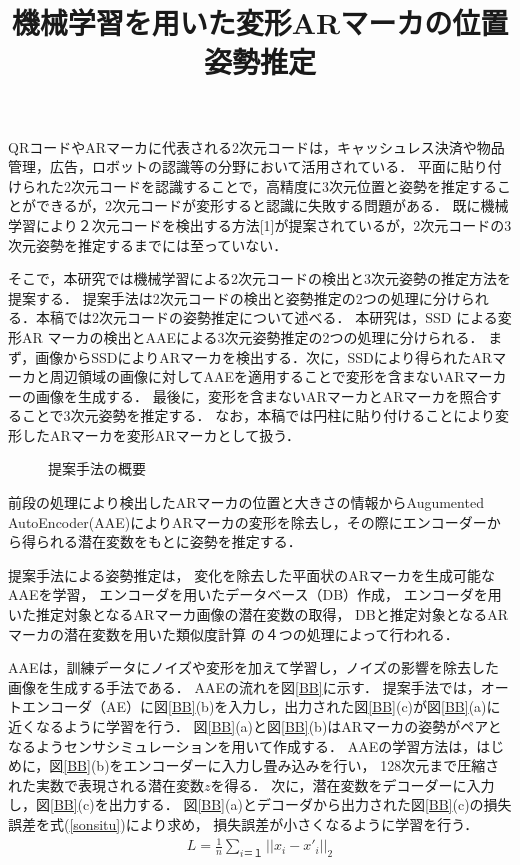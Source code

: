 \documentclass{jsarticle}
\title{機械学習を用いた変形ARマーカの位置姿勢推定}
\begin{document}
\maketitle

QRコードやARマーカに代表される2次元コードは，キャッシュレス決済や物品管理，広告，ロボットの認識等の分野において活用されている．
平面に貼り付けられた2次元コードを認識することで，高精度に3次元位置と姿勢を推定することができるが，2次元コードが変形すると認識に失敗する問題がある．
既に機械学習により２次元コードを検出する方法[1]が提案されているが，2次元コードの3次元姿勢を推定するまでには至っていない．

そこで，本研究では機械学習による2次元コードの検出と3次元姿勢の推定方法を提案する．
提案手法は2次元コードの検出と姿勢推定の2つの処理に分けられる．本稿では2次元コードの姿勢推定について述べる．
本研究は，SSD による変形AR マーカの検出とAAEによる3次元姿勢推定の2つの処理に分けられる．
まず，画像からSSDによりARマーカを検出する．次に，SSDにより得られたARマーカと周辺領域の画像に対してAAEを適用することで変形を含まないARマーカーの画像を生成する．
最後に，変形を含まないARマーカとARマーカを照合することで3次元姿勢を推定する．
なお，本稿では円柱に貼り付けることにより変形したARマーカを変形ARマーカとして扱う．

\begin{figure}[ht]
\vspace{0zh}
\setlength{\epsfxsize}{7.5cm}
\centerline{}
\vspace{-1zh}
\caption{提案手法の概要}
\label{flow}
\vspace{-2zh}
\end{figure}

前段の処理により検出したARマーカの位置と大きさの情報からAugumented AutoEncoder(AAE)によりARマーカの変形を除去し，その際にエンコーダーから得られる潜在変数をもとに姿勢を推定する．

提案手法による姿勢推定は，
変化を除去した平面状のARマーカを生成可能な
AAEを学習，
エンコーダを用いたデータベース（DB）作成，
エンコーダを用いた推定対象となるARマーカ画像の潜在変数の取得，
DBと推定対象となるARマーカの潜在変数を用いた類似度計算
の４つの処理によって行われる．

AAEは，訓練データにノイズや変形を加えて学習し，ノイズの影響を除去した画像を生成する手法である．
AAEの流れを図\ref{BB}に示す．
提案手法では，オートエンコーダ（AE）に図\ref{BB}(b)を入力し，出力された図\ref{BB}(c)が図\ref{BB}(a)に近くなるように学習を行う．
図\ref{BB}(a)と図\ref{BB}(b)はARマーカの姿勢がペアとなるようセンサシミュレーションを用いて作成する．
AAEの学習方法は，はじめに，図\ref{BB}(b)をエンコーダーに入力し畳み込みを行い，
128次元まで圧縮された実数で表現される潜在変数$z$を得る．
次に，潜在変数をデコーダーに入力し，図\ref{BB}(c)を出力する．
図\ref{BB}(a)とデコーダから出力された図\ref{BB}(c)の損失誤差を式(\ref{sonsitu})により求め，
損失誤差が小さくなるように学習を行う．
\begin{eqnarray}
\label{sonsitu}
L=\frac{1}{n}\sum_{i＝１} ||x_i-x'_i||_2
\end{eqnarray}
\end{document}
